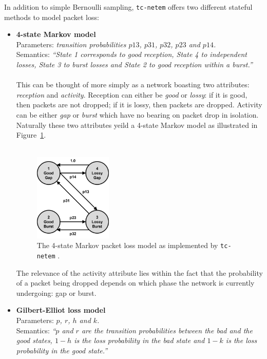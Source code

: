 In addition to simple Bernoulli sampling, \texttt{tc-netem} offers two different stateful methods to model packet
loss\cite{tc_netem_8_man}:
\begin{itemize}
    \item \textbf{4-state Markov model} \\
    Parameters: \emph{transition probabilities $p13$, $p31$, $p32$, $p23$ and $p14$.} \\
    Semantics: \emph{``State 1 corresponds to good reception, State 4 to independent losses, State 3 to burst losses
    and State 2 to good reception within a burst.''} \\ \\
    This can be thought of more simply as a network boasting two attributes: \emph{reception} and \emph{activity}.
    Reception can either be \emph{good} or \emph{lossy}: if it is good, then packets are not dropped; if it is lossy,
    then packets are dropped. Activity can be either \emph{gap} or \emph{burst} which have no bearing on packet drop
    in isolation. Naturally these two attributes yeild a 4-state Markov model as illustrated in
    Figure~\ref{fig:chapter_3_design-tc_netem_4_state_marvok_diagram}. \\ \\
    \begin{figure}[!h]
        \includegraphics[width=0.35\textwidth]{images/chapter_3_design/tc_netem_4_state_marvok_diagram}
        \centering
        \caption{The 4-state Markov packet loss model as implemented by \texttt{tc-netem}\cite{tc_netem_src}
        .}\label{fig:chapter_3_design-tc_netem_4_state_marvok_diagram}
    \end{figure}

    The relevance of the activity attribute lies within the fact that the probability of a packet being dropped
    depends on which phase the network is currently undergoing: gap or burst.
    \item \textbf{Gilbert-Elliot loss model} \\
    Parameters: \emph{$p$, $r$, $h$ and $k$.} \\
    Semantics: \emph{``$p$ and $r$ are the transition probabilities between the bad and the good states, $1-h$ is the
    loss probability in the bad state and $1-k$ is the loss probability in the good state.''}
\end{itemize}

